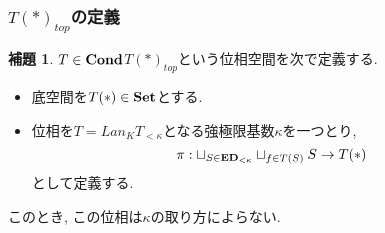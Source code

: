 \documentclass[dvipdfmx,a4paper,11pt]{article}
\theoremstyle{definition}
\newtheorem{lem}[thm]{補題}
\begin{document}
\subsubsection{$T(\ast)_{top}$の定義}
 \begin{tcolorbox}
 [colback = white, colframe = green!35!black, fonttitle = \bfseries,breakable = true]
\begin{lem} \cite{Sch19}
$T \in {\bf Cond}$$T(\ast)_{top}$という位相空間を次で定義する.
\begin{itemize}
\item 底空間を$T(\ast) \in {\bf Set}$とする. 
\item 位相を$T = Lan_{K}T_{<\kappa}$となる強極限基数$\kappa$を一つとり, 
$$
\pi : \sqcup_{S \in {\bf ED}_{<\kappa}}  \sqcup_{f \in T(S) }  S \to T(\ast)
$$
として定義する.
\end{itemize}
このとき, この位相は$\kappa$の取り方によらない. 
\end{lem}
 \end{tcolorbox}
\end{document}
